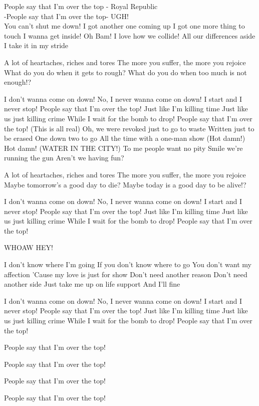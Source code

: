 \documentclass{article}
\begin{document}
People say that I'm over the top - Royal Republic\\

-People say that I'm over the top-
UGH!\\

You can't shut me down!
I got another one coming up
I got one more thing to touch
I wanna get inside!
Oh Bam! I love how we collide!
All our differences aside
I take it in my stride

A lot of heartaches, riches and tores
The more you suffer, the more you rejoice
What do you do when it gets to rough?
What do you do when too much is not enough!?

I don't wanna come on down!
No, I never wanna come on down!
I start and I never stop!
People say that I'm over the top!
Just like I'm killing time
Just like us just killing crime
While I wait for the bomb to drop!
People say that I'm over the top!
(This is all real)
Oh, we were revoked just to go to waste
Written just to be erased
One down two to go
All the time with a one-man show
(Hot damn!)
Hot damn!
(WATER IN THE CITY!)
To me people want no pity
Smile we're running the gun
Aren't we having fun?

A lot of heartaches, riches and tores
The more you suffer, the more you rejoice
Maybe tomorrow's a good day to die?
Maybe today is a good day to be alive!?

I don't wanna come on down!
No, I never wanna come on down!
I start and I never stop!
People say that I'm over the top!
Just like I'm killing time
Just like us just killing crime
While I wait for the bomb to drop!
People say that I'm over the top!

WHOAW HEY!

I don't know where I'm going
If you don't know where to go
You don't want my affection
'Cause my love is just for show
Don't need another reason
Don't need another side
Just take me up on life support
And I'll fine

I don't wanna come on down!
No, I never wanna come on down!
I start and I never stop!
People say that I'm over the top!
Just like I'm killing time
Just like us just killing crime
While I wait for the bomb to drop!
People say that I'm over the top!

People say that I'm over the top!

People say that I'm over the top!

People say that I'm over the top!

People say that I'm over the top!
\end{document}
